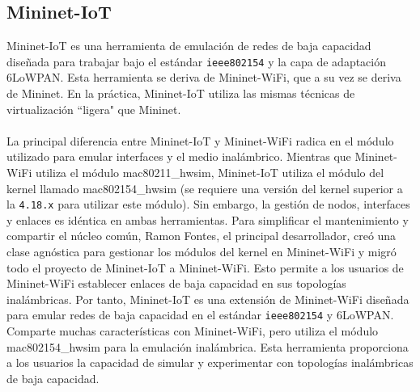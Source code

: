 \subsection{Mininet-IoT}
\label{mininetIoT}

Mininet-IoT \cite{mininetIOT} es una herramienta de emulación de redes de baja capacidad diseñada para trabajar bajo el estándar \texttt{ieee802154} y la capa de adaptación 6LoWPAN. Esta herramienta se deriva de Mininet-WiFi, que a su vez se deriva de Mininet. En la práctica, Mininet-IoT utiliza las mismas técnicas de virtualización ``ligera" que Mininet.\\
\\
La principal diferencia entre Mininet-IoT y Mininet-WiFi radica en el módulo utilizado para emular interfaces y el medio inalámbrico. Mientras que Mininet-WiFi utiliza el módulo mac80211\_hwsim, Mininet-IoT utiliza el módulo del kernel llamado mac802154\_hwsim (se requiere una versión del kernel superior a la \texttt{4.18.x} para utilizar este módulo). Sin embargo, la gestión de nodos, interfaces y enlaces es idéntica en ambas herramientas. Para simplificar el mantenimiento y compartir el núcleo común, Ramon Fontes, el principal desarrollador, creó una clase agnóstica para gestionar los módulos del kernel en Mininet-WiFi y migró todo el proyecto de Mininet-IoT a Mininet-WiFi. Esto permite a los usuarios de Mininet-WiFi establecer enlaces de baja capacidad en sus topologías inalámbricas. Por tanto, Mininet-IoT es una extensión de Mininet-WiFi diseñada para emular redes de baja capacidad en el estándar \texttt{ieee802154} y 6LoWPAN. Comparte muchas características con Mininet-WiFi, pero utiliza el módulo mac802154\_hwsim para la emulación inalámbrica. Esta herramienta proporciona a los usuarios la capacidad de simular y experimentar con topologías inalámbricas de baja capacidad.